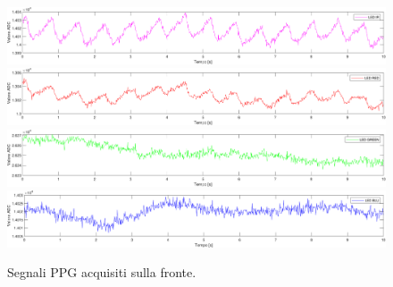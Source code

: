 \begin{figure}[h]
	\centering
	\includegraphics[width=1\linewidth]{ImageFiles/Misure Preliminari/Soggetto 1/fronte_ired}
	\includegraphics[width=1\linewidth]{ImageFiles/Misure Preliminari/Soggetto 1/fronte_red}
	\includegraphics[width=1\linewidth]{ImageFiles/Misure Preliminari/Soggetto 1/fronte_green}
	\includegraphics[width=1\linewidth]{ImageFiles/Misure Preliminari/Soggetto 1/fronte_blu}
	\caption{Segnali PPG acquisiti sulla fronte.}
	\label{fig:soggetto1_fronte}
\end{figure}






\clearpage